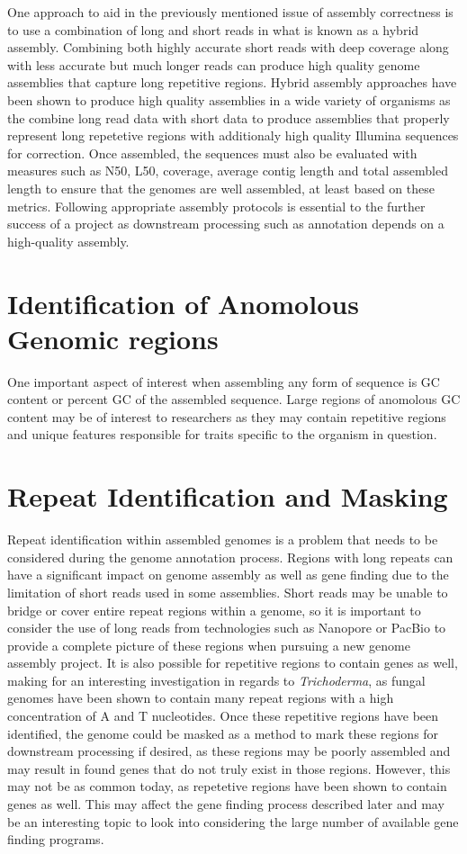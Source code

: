 One approach to aid in the previously mentioned issue of assembly
correctness is to use a combination of long and short reads in what is
known as a hybrid assembly. Combining both highly accurate short reads
with deep coverage along with less accurate but much longer reads can
produce high quality genome assemblies that capture long repetitive
regions. Hybrid assembly approaches have been shown to produce high
quality assemblies in a wide variety of organisms as the combine long
read data with short data to produce assemblies that properly
represent long repetetive regions with additionaly high quality
Illumina sequences for correction. Once assembled, the sequences must
also be evaluated with measures such as N50, L50, coverage, average
contig length and total assembled length to ensure that the genomes
are well assembled, at least based on these
metrics\cite{Nagarajan2013}. Following appropriate assembly protocols
is essential to the further success of a project as downstream
processing such as annotation depends on a high-quality assembly.

\section{Identification of Anomolous Genomic regions}
One important aspect of interest when assembling any form of sequence
is GC content or percent GC of the assembled sequence. Large regions
of anomolous GC content may be of interest to researchers as they may
contain repetitive regions and unique features responsible for traits
specific to the organism in question.

\section{Repeat Identification and Masking}
Repeat identification within assembled genomes is a problem that needs
to be considered during the genome annotation process. Regions with
long repeats can have a significant impact on genome assembly as well
as gene finding due to the limitation of short reads used in some
assemblies\cite{Treangen2011}. Short reads may be unable to bridge or
cover entire repeat regions within a genome, so it is important to
consider the use of long reads from technologies such as Nanopore or
PacBio\texttrademark \cite{Rhoads2015} to provide a complete picture of
these regions when pursuing a new genome assembly project. It is also
possible for repetitive regions to contain genes as well, making for
an interesting investigation in regards to \textit{Trichoderma}, as
fungal genomes have been shown to contain many repeat regions with a
high concentration of A and T
nucleotides\cite{10.1371/journal.pgen.1007467}. Once these repetitive
regions have been identified, the genome could be masked as a method
to mark these regions for downstream processing if desired, as these
regions may be poorly assembled and may result in found genes that do
not truly exist in those regions. However, this may not be as common
today, as repetetive regions have been shown to contain genes as
well\cite{Slotkin2018}. This may affect the gene finding process
described later and may be an interesting topic to look into
considering the large number of available gene finding programs.


